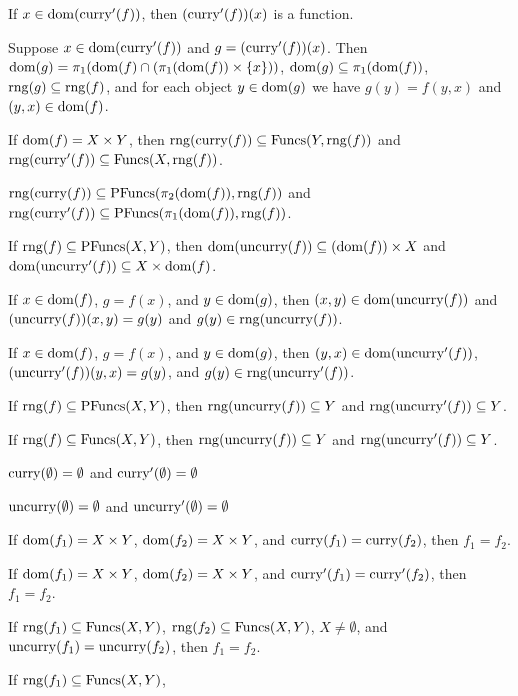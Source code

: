 \documentclass{article}
\begin{document}
\begin{thm}
\item\label{funct5:33} If $x\in\dom(\curry'(f))$, then $(\curry'(f))(x)$
  is a function.
\item\label{funct5:34} Suppose $x\in\dom(\curry'(f))$ and $g=(\curry'(f))(x)$.
  Then $\dom(g)=\proj1(\dom(f)\cap(\proj1(\dom(f))\times\{x\}))$,
  $\dom(g)\subset\proj1(\dom(f))$,
  $\rng(g)\subset\rng(f)$,
  and for each object $y\in\dom(g)$ we have $g(y)=f(y,x)$ and $(y,x)\in\dom(f)$.
\item\label{funct5:35} If $\dom(f)=X\times Y$, then
  $\rng(\curry(f))\subset\Funcs(Y,\rng(f))$ and $\rng(\curry'(f))\subset\Funcs(X,\rng(f))$.
\item\label{funct5:36} $\rng(\curry(f))\subset\PFuncs(\proj2(\dom(f)),\rng(f))$
  and $\rng(\curry'(f))\subset\PFuncs(\proj1(\dom(f)),\rng(f))$.
\item\label{funct5:37} If $\rng(f)\subset\PFuncs(X,Y)$,
  then $\dom(\uncurry(f))\subset(\dom(f))\times X$ and
  $\dom(\uncurry'(f))\subset X\times\dom(f)$.
\item\label{funct5:38} If $x\in\dom(f)$, $g=f(x)$, and $y\in\dom(g)$,
  then $(x,y)\in\dom(\uncurry(f))$ and $(\uncurry(f))(x,y)=g(y)$ and $g(y)\in\rng(\uncurry(f))$.
\item\label{funct5:39} If $x\in\dom(f)$, $g=f(x)$, and $y\in\dom(g)$,
  then $(y,x)\in\dom(\uncurry'(f))$, $(\uncurry'(f))(y,x)=g(y)$, and
  $g(y)\in\rng(\uncurry'(f))$. 
\item\label{funct5:40} If $\rng(f)\subset\PFuncs(X,Y)$, then
  $\rng(\uncurry(f))\subset Y$ and $\rng(\uncurry'(f))\subset Y$.
\item\label{funct5:41} If $\rng(f)\subset\Funcs(X,Y)$, then
  $\rng(\uncurry(f))\subset Y$ and $\rng(\uncurry'(f))\subset Y$.
\item\label{funct5:42} $\curry(\emptyset)=\emptyset$ and $\curry'(\emptyset)=\emptyset$
\item\label{funct5:43} $\uncurry(\emptyset)=\emptyset$ and $\uncurry'(\emptyset)=\emptyset$
\item\label{funct5:44} If $\dom(f_{1})=X\times Y$, $\dom(f_{2})=X\times Y$,
  and $\curry(f_{1})=\curry(f_{2})$, then $f_{1}=f_{2}$.
\item\label{funct5:45} If $\dom(f_{1})=X\times Y$, $\dom(f_{2})=X\times Y$,
  and $\curry'(f_{1})=\curry'(f_{2})$, then $f_{1}=f_{2}$.
\item\label{funct5:46} If $\rng(f_{1})\subset\Funcs(X,Y)$,
  $\rng(f_{2})\subset\Funcs(X,Y)$, $X\neq\emptyset$, and
  $\uncurry(f_{1})=\uncurry(f_{2})$, then $f_{1}=f_{2}$.
\item\label{funct5:47} If $\rng(f_{1})\subset\Funcs(X,Y)$,

\end{thm}
\end{document}
